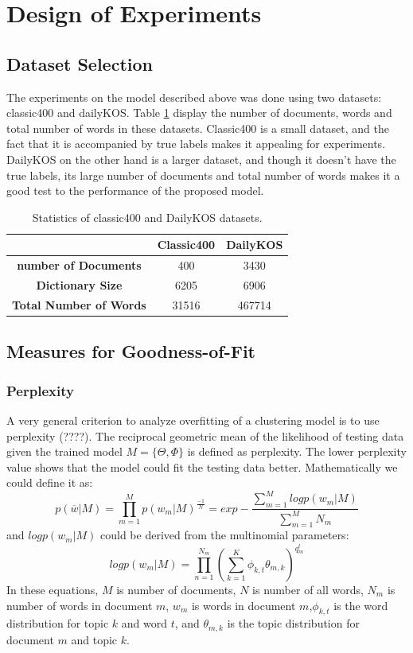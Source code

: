 \documentclass[twoside,12pt]{article}
\begin{document}
\section{Design of Experiments}

\subsection{Dataset Selection}
The experiments on the model described above was done using two datasets: classic400 and dailyKOS. Table \ref{tableDatasetStats} display the number of documents, words and total number of words in these datasets. Classic400 is a small dataset, and the fact that it is accompanied by true labels makes it appealing for experiments. DailyKOS on the other hand is a larger dataset, and though it doesn't have the true labels, its large number of documents and total number of words makes it a good test to the performance of the proposed model. 


\begin{table}
\vspace{-2cm}
\center
\begin{tabular}{|c|c|c|}
\hline
 & \textbf{Classic400} & \textbf{DailyKOS} \\
 \hline
\textbf{ number of Documents} & 400 & 3430 \\
\textbf{ Dictionary Size} & 6205 & 6906 \\
\textbf{ Total Number of Words} & 31516 & 467714\\
 \hline
\end{tabular}
\caption{Statistics of classic400 and DailyKOS datasets.}
\label{tableDatasetStats}
\end{table}

\subsection{Measures for Goodness-of-Fit}
\subsubsection{Perplexity}
A very general criterion to analyze overfitting of a clustering model is to use perplexity (????). The reciprocal geometric mean of the likelihood of testing data given the trained model $M={\{\Theta,\Phi\}}$ is defined as perplexity. The lower perplexity value shows that the model could fit the testing data better. Mathematically we could define it as:
\begin{equation}
p(\overline{w}|M)=\prod_{m=1}^M p(w_m|M)^{\frac{-1}{N}}=exp - \frac{\sum_{m=1}^Ml og p(w_m|M)}{\sum_{m=1}^M N_m}
\end{equation}
and $log p(w_m|M)$ could be derived from the multinomial parameters:
\begin{equation}
log p(w_m|M)=\prod_{n=1}^{N_m}(\sum_{k=1}^{K} \phi_{k,t}\theta_{m,k})^{q_m^t}
\end{equation}
In these equations, $M$ is number of documents, $N$ is number of all words, $N_m$ is number of words in document $m$, $w_m$ is words in document $m$,$\phi_{k,t}$ is the word distribution for topic $k$ and word $t$, and $\theta_{m,k}$ is the topic distribution for document $m$ and topic $k$.
\end{document}
